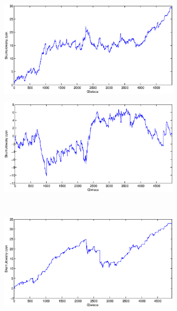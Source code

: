 \begin{figure}[h]
\centering
\begin{minipage}{.49\linewidth}
\centering
\includegraphics[width=0.82\textwidth]{images/S1a_chfjpy.eps}
\label{jedno}
\end{minipage}
\begin{minipage}{.49\linewidth}
\centering
\includegraphics[width=0.82\textwidth]{images/S1b_chfjpy.eps}
\label{dwu}
\end{minipage}
\\
\begin{minipage}{.49\linewidth}
\centering
\includegraphics[width=0.82\textwidth]{images/S1c_chfjpy.eps}
\label{cztero}
\end{minipage}
\begin{minipage}{.49\linewidth}

\end{minipage}
\end{figure}
